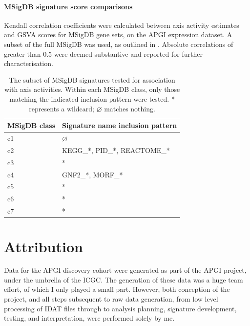 \documentclass[dissertation.tex]{subfiles}
\begin{document}
\paragraph{\acrshort{MSigDB} signature score comparisons}
Kendall correlation coefficients were calculated between axis activity estimates and \gls{GSVA} scores for \gls{MSigDB} gene sets, on the \gls{APGI} expression dataset.  A subset of the full \gls{MSigDB} was used, as outlined in .  Absolute correlations of greater than 0.5 were deemed substantive and reported for further characterisation.

\begin{table}[h]
\centering
\caption[Subset of \acrshort{MSigDB} signatures tested for association with axis activities]{The subset of \acrshort{MSigDB} signatures tested for association with axis activities.  Within each \gls{MSigDB} class, only those matching the indicated inclusion pattern were tested.  * represents a wildcard; $\varnothing$ matches nothing.}\label{sigs-msigdb-subset}
\begin{tabular}{@{}ll@{}}
\toprule
MSigDB class & Signature name inclusion pattern   \\ \midrule
c1           & $\varnothing$                      \\
c2           & KEGG\_*, PID\_*, REACTOME\_*       \\
c3           & *                                  \\
c4           & GNF2\_*, MORF\_*                   \\
c5           & *                                  \\
c6           & *                                  \\
c7           & *                                  \\ \bottomrule
\end{tabular}
\end{table}

\section{Attribution}
Data for the \gls{APGI} discovery cohort were generated as part of the \gls{APGI} project, under the umbrella of the \gls{ICGC}.  The generation of these data was a huge team effort, of which I only played a small part.  However, both conception of the project, and all steps subsequent to raw data generation, from low level processing of \gls{IDAT} files through to analysis planning, signature development, testing, and interpretation, were performed solely by me.
\end{document}
